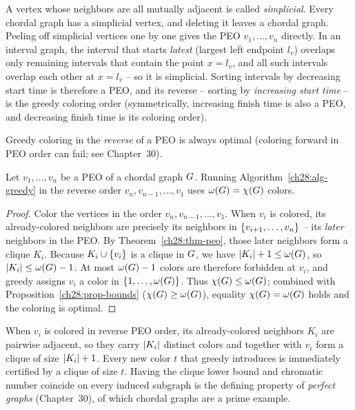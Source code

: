 \begin{intuitionbox}
A vertex whose neighbors are all mutually adjacent is called \emph{simplicial}.
Every chordal graph has a simplicial vertex, and deleting it leaves a chordal graph. Peeling off simplicial vertices one by one gives the PEO $v_1,\dots,v_n$ directly. In an interval graph, the interval that starts \emph{latest} (largest left endpoint $l_v$) overlaps only remaining intervals that contain the point $x=l_v$, and all such intervals overlap each other at $x=l_v$ -- so it is simplicial. Sorting intervals by decreasing start time is therefore a PEO, and its reverse -- sorting by \emph{increasing start time} -- is the greedy coloring order (symmetrically, increasing finish time is also a PEO, and decreasing finish time is its coloring order).
\end{intuitionbox}

Greedy coloring in the \emph{reverse} of a PEO is always optimal (coloring forward in PEO order can fail; see Chapter~30).

\begin{theorem}
\label{ch28:thm-chordal-color}
Let $v_1,\dots,v_n$ be a PEO of a chordal graph $G$. Running Algorithm~\ref{ch28:alg-greedy} in the reverse
order $v_n,v_{n-1},\dots,v_1$ uses $\omega(G)=\chi(G)$ colors.
\end{theorem}

\begin{proof}
Color the vertices in the order $v_n,v_{n-1},\dots,v_1$. When $v_i$ is colored, its
already-colored neighbors are precisely its neighbors in $\{v_{i+1},\dots,v_n\}$ --
its \emph{later} neighbors in the PEO. By Theorem~\ref{ch28:thm-peo}, those later neighbors form a clique $K_i$. Because $K_i\cup\{v_i\}$ is a clique in $G$, we have $\lvert K_i\rvert+1\le\omega(G)$, so $\lvert K_i\rvert\le\omega(G)-1$. At most $\omega(G)-1$ colors are therefore forbidden at $v_i$, and greedy assigns $v_i$ a color in $\{1,\dots,\omega(G)\}$. Thus $\chi(G)\le\omega(G)$; combined with Proposition~\ref{ch28:prop-bounds} ($\chi(G)\ge\omega(G)$), equality $\chi(G)=\omega(G)$ holds and the coloring is optimal.
\end{proof}

\begin{whybox}
When $v_i$ is colored in reverse PEO order, its already-colored neighbors $K_i$ are pairwise adjacent, so they carry $\lvert K_i\rvert$ distinct colors and together with $v_i$ form a clique of size $\lvert K_i\rvert+1$. Every new color $t$ that greedy introduces is immediately certified by a clique of size $t$. Having the clique lower bound and chromatic number coincide on every induced subgraph is the defining property of \emph{perfect graphs} (Chapter~30), of which chordal graphs are a prime example.
\end{whybox}

